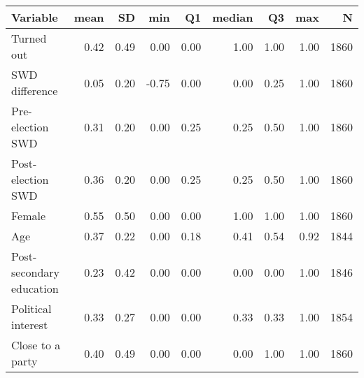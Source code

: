 
\begin{tabular}{l|r|r|r|r|r|r|r|r}
\hline
Variable & mean & SD & min & Q1 & median & Q3 & max & N\\
\hline
Turned out & 0.42 & 0.49 & 0.00 & 0.00 & 1.00 & 1.00 & 1.00 & 1860\\
\hline
SWD difference & 0.05 & 0.20 & -0.75 & 0.00 & 0.00 & 0.25 & 1.00 & 1860\\
\hline
Pre-election SWD & 0.31 & 0.20 & 0.00 & 0.25 & 0.25 & 0.50 & 1.00 & 1860\\
\hline
Post-election SWD & 0.36 & 0.20 & 0.00 & 0.25 & 0.25 & 0.50 & 1.00 & 1860\\
\hline
Female & 0.55 & 0.50 & 0.00 & 0.00 & 1.00 & 1.00 & 1.00 & 1860\\
\hline
Age & 0.37 & 0.22 & 0.00 & 0.18 & 0.41 & 0.54 & 0.92 & 1844\\
\hline
Post-secondary education & 0.23 & 0.42 & 0.00 & 0.00 & 0.00 & 0.00 & 1.00 & 1846\\
\hline
Political interest & 0.33 & 0.27 & 0.00 & 0.00 & 0.33 & 0.33 & 1.00 & 1854\\
\hline
Close to a party & 0.40 & 0.49 & 0.00 & 0.00 & 0.00 & 1.00 & 1.00 & 1860\\
\hline
\end{tabular}
